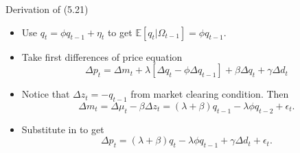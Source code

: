 \documentclass[english,10pt
,aspectratio=169
]{beamer}
\begin{document}
\begin{frame}[noframenumbering]{Derivation of (5.21)}
	\begin{itemize}
		\item Use $q_t=\phi q_{t-1}+\eta_{t}$ to get $\mathbb{E}[q_t|\Omega_{t-1}]=\phi q_{t-1}$.
		\item Take first differences of price equation
		\[
		\Delta p_t = \Delta m_t + \lambda [ \Delta q_t-\phi\Delta q_{t-1}]+\beta \Delta q_t+\gamma \Delta d_t
		\]
		\item Notice that $\Delta z_t=-q_{t-1}$ from market clearing condition. Then
		\[
		\Delta m_t = \Delta \mu_t-\beta \Delta z_t = (\lambda+\beta)q_{t-1}-\lambda \phi q_{t-2}+\epsilon_t.
		\]
		\item Substitute in to get
		\[
		\Delta p_t =(\lambda+\beta)q_{t} - \lambda\phi  q_{t-1}+\gamma \Delta d_t+\epsilon_t.
		\]
		\hyperlink{extending}{}
	\end{itemize}
\end{frame}
\end{document}
